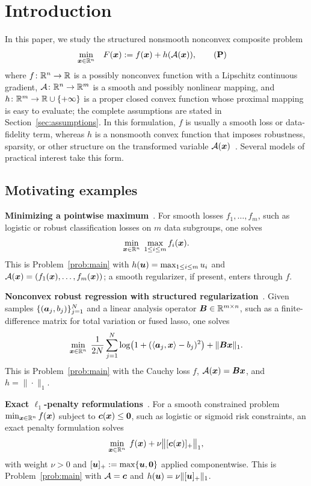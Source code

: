 \section{Introduction}
\label{sec:introduction}
In this paper, we study the structured nonsmooth nonconvex composite problem
\begin{align}
    \min_{\bx\in\RR^n}\quad & F(\bx) := f(\bx) + h(\calA(\bx)),
    \tag{\textbf{P}}    
    \label{prob:main}
\end{align}
where \(f\colon\mathbb{R}^n\to\mathbb{R}\) is a possibly nonconvex function with a Lipschitz
continuous gradient, \(\mathcal{A}\colon\mathbb{R}^n\to\mathbb{R}^m\) is a smooth and possibly nonlinear
mapping, and \(h\colon\mathbb{R}^m\to\mathbb{R}\cup\{+\infty\}\) is a proper closed convex function
whose proximal mapping is easy to evaluate; the complete assumptions are stated in
Section~\ref{sec:assumptions}. In this formulation, \(f\) is
usually a smooth loss or data-fidelity term, whereas \(h\) is a nonsmooth convex function
that imposes robustness, sparsity, or other structure on the transformed variable
\(\mathcal{A}(\bm{x})\)~\cite{charisopoulos2021low}. Several models 
of practical interest take this form.  
\subsection{Motivating examples}
\textbf{Minimizing a pointwise maximum}~\cite{zhang2020smoothed}.
For smooth losses \(f_1,\dots,f_m\), such as logistic or robust classification
losses on \(m\) data subgroups, one solves  
\begin{equation*}
  \min_{\bm{x}\in\mathbb{R}^n}\;\max_{1\le i\le m} f_i(\bm{x}).
\end{equation*}
This is Problem~\eqref{prob:main} with \(h(\bm{u})=\max_{1\le i\le m}u_i\) and
\(\mathcal{A}(\bm{x})=(f_1(\bm{x}),\dots,f_m(\bm{x}))\); a smooth regularizer, if present, 
enters through \(f\). 

\textbf{Nonconvex robust regression with structured regularization}~\cite{bohm2021variable}.
Given samples \(\{(\bm{a}_j,b_j)\}_{j=1}^N\) and a linear analysis operator
\(\bm{B}\in\mathbb{R}^{m\times n}\), such as a finite-difference matrix for total variation
or fused lasso, one solves
\begin{equation*}
  \min_{\bm{x}\in\mathbb{R}^n}\;
  \frac{1}{2N}\sum_{j=1}^N\log\bigl(1+(\langle\bm{a}_j,\bm{x}\rangle-b_j)^2\bigr)
  +\|\bm{B}\bm{x}\|_1.
\end{equation*}
This is Problem~\eqref{prob:main} with the Cauchy loss \(f\),
\(\mathcal{A}(\bm{x})=\bm{B}\bm{x}\), and \(h=\|\cdot\|_1\).

\textbf{Exact \(\ell_1\)-penalty reformulations}~\cite{burke1985descent,Drusvyatskiy2019}.
For a smooth constrained problem \(\min_{\bm{x}\in\mathbb{R}^n} f(\bm{x})\) subject to
\(\bm{c}(\bm{x})\le\bm{0}\), such as logistic or sigmoid risk constraints, an exact
penalty formulation solves
\begin{equation*}
  \min_{\bm{x}\in\mathbb{R}^n}\; f(\bm{x})+\nu\bigl\|[\bm{c}(\bm{x})]_+\bigr\|_1,
\end{equation*}
with weight \(\nu>0\) and \([\bm{u}]_+:=\max\{\bm{u},\bm{0}\}\) applied componentwise.
This is Problem~\eqref{prob:main} with \(\mathcal{A}=\bm{c}\) and
\(h(\bm{u})=\nu\|[\bm{u}]_+\|_1\).

